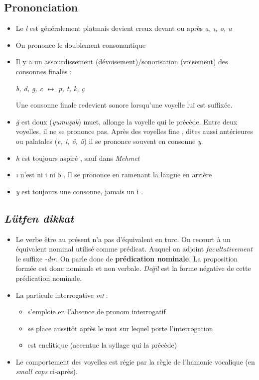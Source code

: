 \documentclass{cours}
\newcommand{\ch}{\c{s}}
\newcommand{\ug}{\u{g}}
\begin{document}
\subsection{Prononciation}
\begin{itemize}
    \item Le \textit{l} est généralement \og plat\fg mais devient \og creux \fg devant ou après \textit{a, \i, o, u}
    \item On prononce le doublement consonantique
    \item Il y a un assourdissement (dévoisement)/sonorisation (voisement) des consonnes finales :
          \begin{center}
              \textit{b, d, g, c} $\leftrightarrow$ \textit{p, t, k, ç}
          \end{center}
          Une consonne finale redevient sonore lorsqu'une voyelle lui est suffixée.
    \item \textit{\ug} est \og doux \fg (\textit{yumu\ch ak}) muet, allonge la voyelle qui le précède. Entre deux voyelles, il ne se prononce pas. Après des voyelles \og fine \fg, dites aussi antérieures ou palatales (\textit{e, i, ö, ü}) il se prononce souvent en consonne \textit{y}.
    \item \textit{h} est toujours \og aspiré \fg, sauf dans \textit{Mehmet}
    \item \textit{\i} n'est ni \og i \fg ni \og ö \fg. Il se prononce en ramenant la langue en arrière
    \item \textit{y} est toujours une consonne, jamais un \og i \fg.
\end{itemize}

\subsection{\textit{Lütfen dikkat}}
\begin{itemize}
    \item Le verbe \og être \fg au présent n'a pas d'équivalent en turc. On recourt à un équivalent nominal utilisé comme prédicat. Auquel on adjoint \emph{facultativement} le suffixe \textit{-d\i r}. On parle donc de {\bf prédication nominale}. La proposition formée est donc nominale et non verbale. \textit{De\ug il} est la forme négative de cette prédication nominale.
    \item La particule interrogative \textit{m\textsc{i}} :
          \begin{itemize}
              \item s'emploie en l'absence de pronom interrogatif
              \item se place aussitôt après le mot sur lequel porte l'interrogation
              \item est enclitique (accentue la syllage qui la précède)
          \end{itemize}
    \item Le comportement des voyelles est régie par la règle de l'hamonie vocalique (en \textsl{small caps} ci-après).
\end{itemize}
\end{document}
